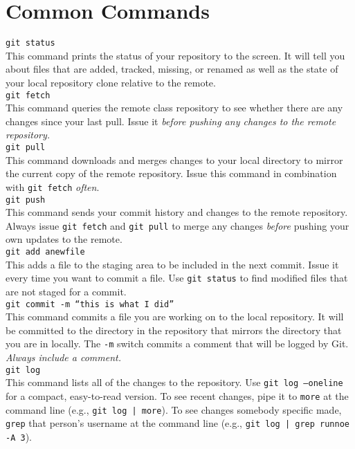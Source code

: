 \documentclass[12pt, letterpaper]{article}
\newcommand{\code}{\texttt}
\begin{document}
\hypertarget{refbkmk5}{}
\section*{Common Commands}

\noindent \code{git status} \\
\noindent This command prints the status of your repository to the screen.  It will tell you about files that are added, tracked, missing, or renamed as well as the state of your local repository clone relative to the remote. \\

\noindent \code{git fetch} \\
\noindent This command queries the remote class repository to see whether there are any changes since your last pull.  Issue it {\it before pushing any changes to the remote repository.} \\

\noindent \code{git pull} \\
\noindent This command downloads and merges changes to your local directory to mirror the current copy of the remote repository.  Issue this command in combination with \code{git fetch} {\it often}.\\

\noindent \code{git push} \\
\noindent This command sends your commit history and changes to the remote repository.  Always issue \code{git fetch} and \code{git pull} to merge any changes {\it before} pushing your own updates to the remote.  \\

\noindent \code{git add anewfile} \\
This adds a file to the staging area to be included in the next commit.  Issue it every time you want to commit a file.  Use \code{git status} to find modified files that are not staged for a commit. \\

\noindent \code{git commit -m ``this is what I did''} \\
This command commits a file you are working on to the local repository.  It will be committed to the directory in the repository that mirrors the directory that you are in locally.  The \code{-m} switch commits a comment that will be logged by Git. {\it Always include a comment.} \\

\noindent \code{git log} \\
This command lists all of the changes to the repository.  Use \code{git log --oneline} for a compact, easy-to-read version.  To see recent changes, pipe it to \code{more} at the command line (e.g., \code{git log | more}).  To see changes somebody specific made, \code{grep} that person's username at the command line (e.g., \code{git log | grep runnoe -A 3}). \\
\end{document}
